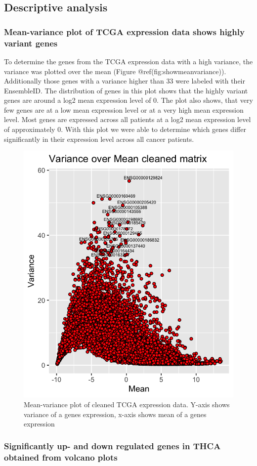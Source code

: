 \documentclass[
]{article}
\begin{document}
\hypertarget{descriptive-analysis}{%
\subsection{Descriptive analysis}\label{descriptive-analysis}}

\hypertarget{mean-variance-plot-of-tcga-expression-data-shows-highly-variant-genes}{%
\subsubsection{Mean-variance plot of TCGA expression data shows highly
variant
genes}\label{mean-variance-plot-of-tcga-expression-data-shows-highly-variant-genes}}

To determine the genes from the TCGA expression data with a high
variance, the variance was plotted over the mean (Figure
@ref(fig:showmeanvariance)). Additionally those genes with a variance
higher than 33 were labeled with their EnsembleID. The distribution of
genes in this plot shows that the highly variant genes are around a log2
mean expression level of 0. The plot also shows, that very few genes are
at a low mean expression level or at a very high mean expression level.
Most genes are expressed across all patients at a log2 mean expression
level of approximately 0. With this plot we were able to determine which
genes differ significantly in their expression level across all cancer
patients.

\begin{figure}

{\centering \includegraphics[width=0.3\linewidth]{figures/Variance_over mean_cleaned_matrix} 

}

\caption{Mean-variance plot of cleaned TCGA expression data. Y-axis shows variance of a genes expression, x-axis shows mean of a genes expression}\label{fig:showmeanvariance}
\end{figure}

\hypertarget{significantly-up--and-down-regulated-genes-in-thca-obtained-from-volcano-plots}{%
\subsubsection{Significantly up- and down regulated genes in THCA
obtained from volcano
plots}\label{significantly-up--and-down-regulated-genes-in-thca-obtained-from-volcano-plots}}
\end{document}
